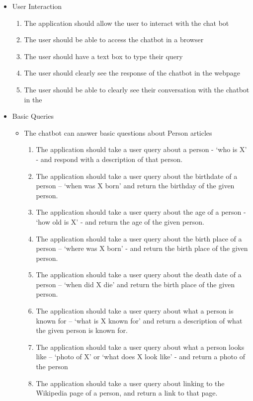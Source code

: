 \begin{itemize}
	\item User Interaction
	\begin{enumerate}[label*=F\arabic*.]
		\item The application should allow the user to interact with the chat bot
		\item The user should be able to access the chatbot in a browser
		\item The user should have a text box to type their query
		\item The user should clearly see the response of the chatbot in the webpage
		\item The user should be able to clearly see their conversation with the chatbot in the 
	\end{enumerate}
	\item Basic Queries
	\begin{itemize}
		\item The chatbot can answer basic questions about Person articles
		\begin{enumerate}[resume*]
			\item The application should take a user query about a person - ‘who is X’ - and respond with a description of that person.
			\item The application should take a user query about the birthdate of a person – ‘when was X born’ and return the birthday of the given person.
			\item The application should take a user query about the age of a person - ‘how old is X’ - and return the age of the given person.
			\item The application should take a user query about the birth place of a person – ‘where was X born’ -  and return the birth place of the given person. 
			\item The application should take a user query about the death date of a person – ‘when did X die’ and return the birth place of the given person. 
			\item The application should take a user query about what a person is known for – ‘what is X known for’ and return a description of what the given person is known for.
			\item The application should take a user query about what a person looks like – ‘photo of X’ or ‘what does X look like’ - and return a photo of the person
			\item The application should take a user query about linking to the Wikipedia page of a person, and return a link to that page.

\end{enumerate}
\end{itemize}
\end{itemize}
